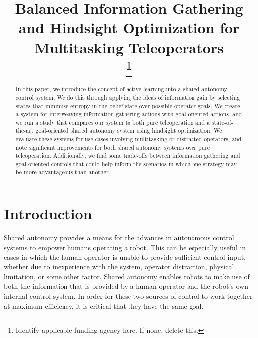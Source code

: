 \documentclass[conference]{IEEEtran}
\begin{document}
\title{Balanced Information Gathering and Hindsight Optimization for Multitasking Teleoperators\\
\thanks{Identify applicable funding agency here. If none, delete this.}
}

\author{
\and
{}
}

\maketitle

\begin{abstract}
In this paper, we introduce the concept of active learning into a shared autonomy control system. We do this through applying the ideas of information gain by selecting states that minimize entropy in the belief state over possible operator goals. We create a system for interweaving information gathering actions with goal-oriented actions, and we run a study that compares our system to both pure teleoperation and a state-of-the-art goal-oriented shared autonomy system using hindsight optimization. We evaluate these systems for use cases involving multitasking or distracted operators, and note significant improvements for both shared autonomy systems over pure teleoperation. Additionally, we find some trade-offs between information gathering and goal-oriented controls that could help inform the scenarios in which one strategy may be more advantageous than another.
\end{abstract}

\section{Introduction}

Shared autonomy \cite{dragan2012formalizing} provides a means for the advances in autonomous control systems to empower humans operating a robot. This can be especially useful in cases in which the human operator is unable to provide sufficient control input, whether due to inexperience with the system, operator distraction, physical limitation, or some other factor. Shared autonomy enables robots to make use of both the information that is provided by a human operator and the robot's own internal control system. In order for these two sources of control to work together at maximum efficiency, it is critical that they have the same goal.
\end{document}
